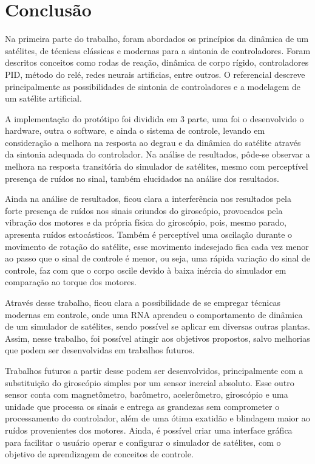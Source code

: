 \chapter[Conclusão]{Conclusão}

Na primeira parte do trabalho, foram abordados os princípios da dinâmica de um satélites, de técnicas clássicas e modernas para a sintonia de controladores. Foram descritos conceitos como rodas de reação, dinâmica de corpo rígido, controladores PID, método do relé, redes neurais artificias, entre outros. O referencial descreve principalmente as possibilidades de sintonia de controladores e a modelagem de um satélite artificial.

A implementação do protótipo foi dividida em 3 parte, uma foi o desenvolvido o hardware, outra o software, e ainda o sistema de controle, levando em consideração a melhora na resposta ao degrau e da dinâmica do satélite através da sintonia adequada do controlador. Na análise de resultados, pôde-se observar a melhora na resposta transitória do simulador de satélites, mesmo com perceptível presença de ruídos no sinal, também elucidados na análise dos resultados.

Ainda na análise de resultados, ficou clara a interferência nos resultados pela forte presença de ruídos nos sinais oriundos do giroscópio, provocados pela vibração dos motores e da própria física do giroscópio, pois, mesmo parado, apresenta ruídos estocásticos. Também é perceptível uma oscilação durante o movimento de rotação do satélite, esse movimento indesejado fica cada vez menor ao passo que o sinal de controle é menor, ou seja, uma rápida variação do sinal de controle, faz com que o corpo oscile devido à baixa inércia do simulador em comparação ao torque dos motores.

Através desse trabalho, ficou clara a possibilidade de se empregar técnicas modernas em controle, onde uma RNA aprendeu o comportamento de dinâmica de um simulador de satélites, sendo possível se aplicar em diversas outras plantas. Assim, nesse trabalho, foi possível atingir aos objetivos propostos, salvo melhorias que podem ser desenvolvidas em trabalhos futuros.

Trabalhos futuros a partir desse podem ser desenvolvidos, principalmente com a substituição do giroscópio simples por um sensor inercial absoluto. Esse outro sensor conta com magnetômetro, barômetro, acelerômetro, giroscópio e uma unidade que processa os sinais e entrega as grandezas sem comprometer o processamento do controlador, além de uma ótima exatidão e blindagem maior ao ruídos provenientes dos motores. Ainda, é possível criar uma interface gráfica para facilitar o usuário operar e configurar o simulador de satélites, com o objetivo de aprendizagem de conceitos de controle. 


